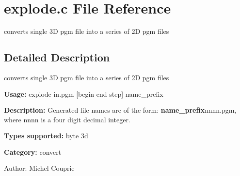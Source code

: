 \section{explode.c File Reference}
\label{explode_8c}
converts single 3D pgm file into a series of 2D pgm files 



\subsection{Detailed Description}
converts single 3D pgm file into a series of 2D pgm files 

{\bf Usage:} explode in.pgm [begin end step] name\_\-prefix

{\bf Description:} Generated file names are of the form: {\bf name\_\-prefix}nnnn.pgm, where nnnn is a four digit decimal integer.

{\bf Types supported:} byte 3d

{\bf Category:} convert

\begin{Desc}
\item[Author:]Michel Couprie \end{Desc}
